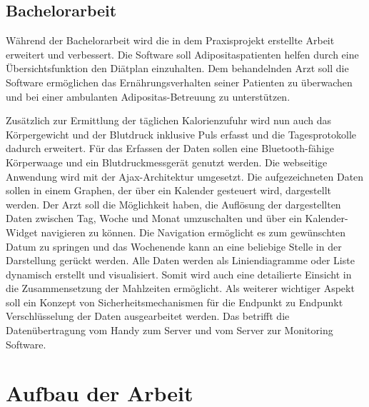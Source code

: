 \subsection*{Bachelorarbeit}

W\"ahrend der Bachelorarbeit wird die in dem Praxisprojekt erstellte Arbeit erweitert und verbessert.
Die Software soll Adipositaspatienten helfen durch eine \"Ubersichtsfunktion den Di\"atplan einzuhalten.
Dem behandelnden Arzt soll die Software erm\"oglichen das Ern\"ahrungsverhalten seiner Patienten zu \"uberwachen und bei einer ambulanten 
Adipositas-Betreuung zu unterst\"utzen.

Zus\"atzlich zur Ermittlung der t\"aglichen Kalorienzufuhr wird 
nun auch das K\"orpergewicht und der Blutdruck inklusive Puls erfasst und die Tagesprotokolle dadurch erweitert. 
F\"ur das Erfassen der Daten sollen eine Bluetooth-f\"ahige K\"orperwaage und ein Blutdruckmessger\"at genutzt werden. 
Die webseitige Anwendung wird mit der Ajax-Architektur umgesetzt.
Die aufgezeichneten Daten sollen in einem Graphen, der \"uber ein Kalender gesteuert wird, dargestellt werden. 
Der Arzt soll die M\"oglichkeit haben, die Aufl\"osung der dargestellten Daten zwischen Tag, Woche und Monat umzuschalten und 
\"uber ein Kalender-Widget navigieren zu k\"onnen.
Die Navigation erm\"oglicht es zum gew\"unschten Datum zu springen und das Wochenende kann an eine beliebige Stelle in der Darstellung ger\"uckt werden.
Alle Daten werden als Liniendiagramme oder Liste dynamisch erstellt und visualisiert.
Somit wird auch eine detailierte Einsicht in die Zusammensetzung der Mahlzeiten erm\"oglicht.
Als weiterer wichtiger Aspekt soll ein Konzept von Sicherheitsmechanismen f\"ur die Endpunkt zu Endpunkt Verschl\"usselung der Daten ausgearbeitet werden.
Das betrifft die Daten\"ubertragung vom Handy zum Server und vom Server zur Monitoring Software.
 

\section{Aufbau der Arbeit}

